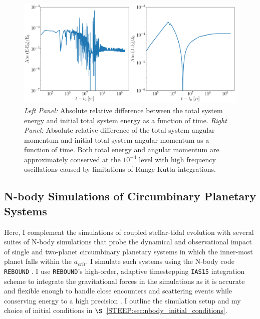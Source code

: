 \begin{figure}
	\includegraphics[width=\textwidth]{conservation.pdf}
    \caption{{\it Left Panel:} Absolute relative difference between the total system energy and initial total system energy as a function of time.  {\it Right Panel:} Absolute relative difference of the total system angular momentum and initial total system angular momentum as a function of time.  Both total energy and angular momentum are approximately conserved at the $10^{-4}$ level with high frequency oscillations caused by limitations of Runge-Kutta integrations.}
    \label{STEEP:fig:conservation}
\end{figure}


\subsection{N-body Simulations of Circumbinary Planetary Systems} \label{STEEP:sec:nbody_methods}

Here, I complement the \vplanet simulations of coupled stellar-tidal evolution with several suites of N-body simulations that probe the dynamical and observational impact of single and two-planet circumbinary planetary systems in which the inner-most planet falls within the $a_{crit}$.  I simulate such systems using the N-body code \texttt{REBOUND} \citep{Rein2012}.  I use \texttt{REBOUND}'s high-order, adaptive timestepping \texttt{IAS15} integration scheme to integrate the gravitational forces in the simulations as it is accurate and flexible enough to handle close encounters and scattering events while conserving energy to a high precision \citep{Rein2015}.  I outline the simulation setup and my choice of initial conditions in $\S$~\ref{STEEP:sec:nbody_initial_conditions}.

